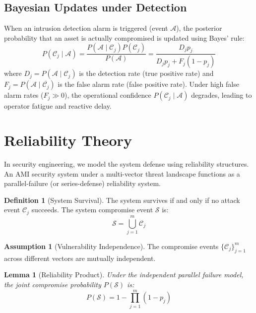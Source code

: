 \documentclass[12pt, oneside, a4paper]{report}
\newtheorem{lemma}[theorem]{Lemma}
\theoremstyle{definition}
\newtheorem{definition}[theorem]{Definition}
\newtheorem{assumption}[theorem]{Assumption}
\theoremstyle{remark}
\begin{document}
\subsection{Bayesian Updates under Detection}
When an intrusion detection alarm is triggered (event $\mathcal{A}$), the posterior probability that an asset is actually compromised is updated using Bayes' rule:
\begin{equation}
P(\mathcal{C}_j \mid \mathcal{A}) = \frac{P(\mathcal{A} \mid \mathcal{C}_j) P(\mathcal{C}_j)}{P(\mathcal{A})} = \frac{D_j p_j}{D_j p_j + F_j (1 - p_j)}
\end{equation}
where $D_j = P(\mathcal{A} \mid \mathcal{C}_j)$ is the detection rate (true positive rate) and $F_j = P(\mathcal{A} \mid \overline{\mathcal{C}_j})$ is the false alarm rate (false positive rate). Under high false alarm rates ($F_j \gg 0$), the operational confidence $P(\mathcal{C}_j \mid \mathcal{A})$ degrades, leading to operator fatigue and reactive delay.

\section{Reliability Theory}
\label{sec:sm:reliability}

In security engineering, we model the system defense using reliability structures. An AMI security system under a multi-vector threat landscape functions as a parallel-failure (or series-defense) reliability system.

\begin{definition}[System Survival]
The system survives if and only if no attack event $\mathcal{C}_j$ succeeds. The system compromise event $\mathcal{S}$ is:
\begin{equation}
\mathcal{S} = \bigcup_{j=1}^{m} \mathcal{C}_j
\end{equation}
\end{definition}

\begin{assumption}[Vulnerability Independence]
The compromise events $\{\mathcal{C}_j\}_{j=1}^m$ across different vectors are mutually independent.
\end{assumption}

\begin{lemma}[Reliability Product]
Under the independent parallel failure model, the joint compromise probability $P(\mathcal{S})$ is:
\begin{equation}
P(\mathcal{S}) = 1 - \prod_{j=1}^{m} (1 - p_j)
\end{equation}
\end{lemma}
\end{document}
